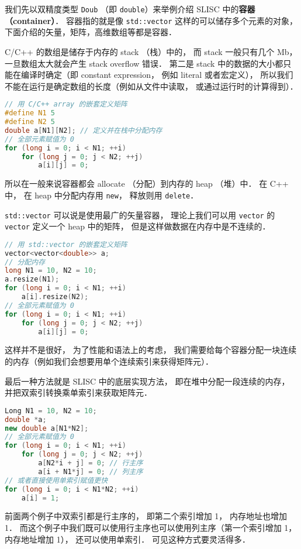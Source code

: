 
\begin{issues}
\issueDraft
\end{issues}


我们先以双精度类型 \verb|Doub| （即 \verb|double|）来举例介绍 SLISC 中的\textbf{容器（container）}． 容器指的就是像 \verb|std::vector| 这样的可以储存多个元素的对象， 下面介绍的矢量，矩阵，高维数组等都是容器．

C/C++ 的数组是储存于内存的 stack （栈）中的， 而 stack 一般只有几个 Mb， 一旦数组太大就会产生 stack overflow 错误． 第二是 stack 中的数据的大小都只能在编译时确定（即 constant expression， 例如 literal 或者宏定义）， 所以我们不能在运行是确定数组的长度（例如从文件中读取， 或通过运行时的计算得到）．
\begin{lstlisting}[language=cpp]
// 用 C/C++ array 的嵌套定义矩阵
#define N1 5
#define N2 5
double a[N1][N2]; // 定义并在栈中分配内存
// 全部元素赋值为 0
for (long i = 0; i < N1; ++i)
    for (long j = 0; j < N2; ++j)
        a[i][j] = 0;
\end{lstlisting}

所以在一般来说容器都会 allocate （分配）到内存的 heap （堆）中． 在 C++ 中， 在 heap 中分配内存用 \verb|new|， 释放则用 \verb|delete|．

\verb|std::vector| 可以说是使用最广的矢量容器， 理论上我们可以用 \verb|vector| 的 \verb|vector| 定义一个 heap 中的矩阵， 但是这样做数据在内存中是不连续的．
\begin{lstlisting}[language=cpp]
// 用 std::vector 的嵌套定义矩阵
vector<vector<double>> a;
// 分配内存
long N1 = 10, N2 = 10;
a.resize(N1);
for (long i = 0; i < N1; ++i)
    a[i].resize(N2);
// 全部元素赋值为 0
for (long i = 0; i < N1; ++i)
    for (long j = 0; j < N2; ++j)
        a[i][j] = 0;
\end{lstlisting}
这样并不是很好， 为了性能和语法上的考虑， 我们需要给每个容器分配一块连续的内存（例如我们会想要用单个连续索引来获得矩阵元）．

最后一种方法就是 SLISC 中的底层实现方法， 即在堆中分配一段连续的内存， 并把双索引转换乘单索引来获取矩阵元．
\begin{lstlisting}[language=cpp]
Long N1 = 10, N2 = 10;
double *a;
new double a[N1*N2];
// 全部元素赋值为 0
for (long i = 0; i < N1; ++i)
    for (long j = 0; j < N2; ++j)
        a[N2*i + j] = 0; // 行主序
        a[i + N1*j] = 0; // 列主序
// 或者直接使用单索引赋值更快
for (long i = 0; i < N1*N2; ++i)
    a[i] = 1;
\end{lstlisting}
前面两个例子中双索引都是行主序的， 即第二个索引增加 1， 内存地址也增加 1． 而这个例子中我们既可以使用行主序也可以使用列主序（第一个索引增加 1， 内存地址增加 1）， 还可以使用单索引． 可见这种方式要灵活得多．

